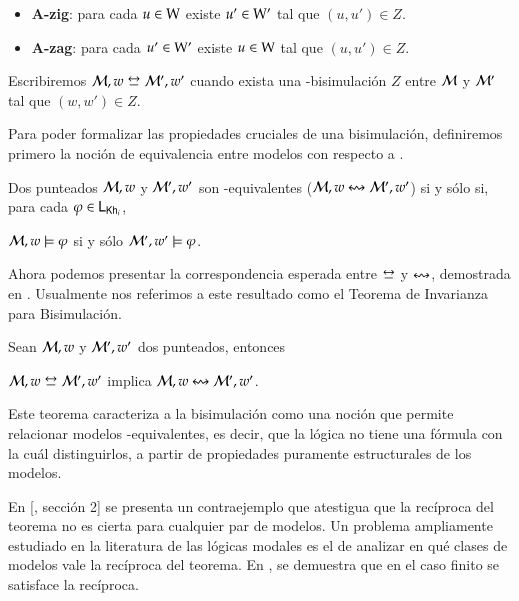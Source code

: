 \begin{definicion}
\begin{itemize}
        \item \textbf{A-zig}: para cada $u \in \mathrm{W}$ existe $u' \in \mathrm{W}'$ tal que $(u,u') \in Z$.

        \item \textbf{A-zag}: para cada $u' \in \mathrm{W}'$ existe $u \in \mathrm{W}$ tal que $(u,u') \in Z$.
    \end{itemize} 

    Escribiremos $\modults,w \bisim \modults',w'$ cuando exista una \KHilogic-bisimulación $Z$ entre
    $\mathcal{M}$ y $\mathcal{M}'$ tal que $(w,w') \in Z$.

\end{definicion}

Para poder formalizar las propiedades cruciales de una bisimulación, definiremos primero la noción de 
equivalencia entre modelos con respecto a \KHilogic.

\begin{definicion}
    Dos \ultss punteados $\mathcal{M},w$ y $\mathcal{M}',w'$ son \KHilogic-equivalentes ($\mathcal{M}, w \mathrel{\leftrightsquigarrow} \mathcal{M}', w'$)
    si y sólo si, para cada $\varphi \in \mathsf{L}_{\mathsf{Kh}_i}$,
    \begin{center}
        $\mathcal{M}, w \models \varphi$ \quad si y sólo \quad $\mathcal{M}', w' \models \varphi$.
    \end{center} 
\end{definicion}

Ahora podemos presentar la correspondencia esperada entre $\bisim$ y $\mathrel{\leftrightsquigarrow}$, demostrada en \cite{ArecesFSV25}.
Usualmente nos referimos a este resultado como el Teorema de Invarianza para Bisimulación.

\begin{teorema}\label{ref:bisim-implies-equivalence}
    Sean $\mathcal{M},w$ y $\mathcal{M}',w'$ dos \ultss punteados, entonces
    \begin{center}
        $\modults,w \bisim \modults',w'$ implica $\mathcal{M},w \mathrel{\leftrightsquigarrow} \mathcal{M}',w'$.
    \end{center}
\end{teorema}

Este teorema caracteriza a la bisimulación como una noción que permite relacionar modelos \KHilogic-equivalentes, es decir, que la lógica no tiene una fórmula con la cuál distinguirlos,
a partir de propiedades puramente estructurales de los modelos.

En [\cite{FervariVQW21}, sección 2] se presenta un contraejemplo que atestigua que la recíproca del teorema no es cierta para cualquier par de modelos.
Un problema ampliamente estudiado en la literatura de las lógicas modales es el de analizar en qué clases de modelos vale la recíproca del teorema.
En \cite{ArecesFSV25}, se demuestra que en el caso finito se satisface la recíproca.

